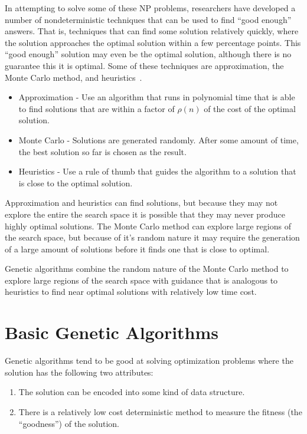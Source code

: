 In attempting to solve some of these NP problems, researchers have developed a
number of nondeterministic techniques that can be used to find ``good enough''
answers. That is, techniques that can find some solution relatively quickly,
where the solution approaches the optimal solution within a few percentage
points. This ``good enough'' solution may even be the optimal solution, although
there is no guarantee this it is optimal. Some of these techniques are
approximation, the Monte Carlo method, and
heuristics~\cite{Cormen:2009:IAT:1614191}.

\begin{itemize}
  \item {Approximation - Use an algorithm that runs in polynomial time that is
  able to find solutions that are within a factor of \(\rho (n)\) of the cost of
  the optimal solution.}
  \item {Monte Carlo - Solutions are generated randomly. After some amount of
  time, the best solution so far is chosen as the result.}
  \item {Heuristics - Use a rule of thumb that guides the algorithm to a
  solution that is close to the optimal solution.}
\end{itemize}

Approximation and heuristics can find solutions, but because they may not
explore the entire the search space it is possible that they may never produce
highly optimal solutions. The Monte Carlo method can explore large regions of
the search space, but because of it's random nature it may require the
generation of a large amount of solutions before it finds one that is close to
optimal.

Genetic algorithms combine the random nature of the Monte Carlo method to
explore large regions of the search space with guidance that is analogous to
heuristics to find near optimal solutions with relatively low time cost.

\section{Basic Genetic Algorithms}

Genetic algorithms tend to be good at solving optimization problems where the
solution has the following two attributes:

\begin{enumerate}
  \item {The solution can be encoded into some kind of data structure.}
  \item {There is a relatively low cost deterministic method to measure the
  fitness (the ``goodness'') of the solution.}
\end{enumerate}

